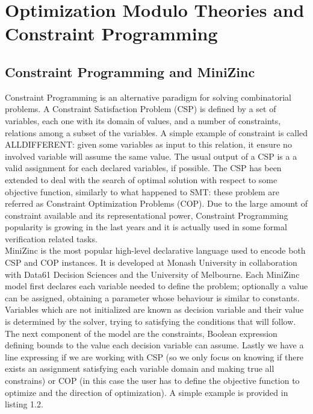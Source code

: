 \chapter{Optimization Modulo Theories and Constraint Programming}
\label{cha:introOMT}

\section{Constraint Programming and MiniZinc}

Constraint Programming is an alternative paradigm for solving combinatorial problems. A Constraint Satisfaction Problem (CSP) is defined by a set of variables, each one with its domain of values, and a number of constraints, relations among a subset of the variables. A simple example of constraint is called ALLDIFFERENT: given some variables as input to this relation, it ensure no involved variable will assume the same value. The usual output of a CSP is a a valid assignment for each declared variables, if possible. The CSP has been extended to deal with the search of optimal solution with respect to some objective function, similarly to what happened to SMT: these problem are referred as Constraint Optimization Problems (COP).
Due to the large amount of constraint available and its representational power, Constraint Programming popularity is growing in the last years and it is actually used in some formal verification related tasks. \\
MiniZinc is the most popular high-level declarative language used to encode both CSP and COP instances. It is developed at Monash University in collaboration with Data61 Decision Sciences and the University of Melbourne. Each MiniZinc model first declares each variable needed to define the problem; optionally a value can be assigned, obtaining a parameter whose behaviour is similar to constants. Variables which are not initialized are known as decision variable and their value is determined by the solver, trying to satisfying the conditions that will follow. The next component of the model are the constraints, Boolean expression defining bounds to the value each decision variable can assume. Lastly we have a line expressing if we are working with CSP (so we only focus on knowing if there exists an assignment satisfying each variable domain and making true all constrains) or COP (in this case the user has to define the objective function to optimize and the direction of optimization). A simple example is provided in listing 1.2.

